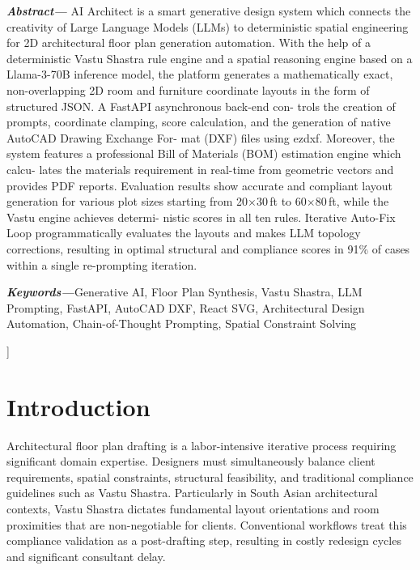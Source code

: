 \documentclass[10pt, twocolumn, letterpaper]{article}
\begin{document}
\begin{center}
\begin{minipage}{0.92\linewidth}
\fontsize{9}{11}\selectfont
\noindent\textbf{\textit{Abstract---}}%
AI Architect is a smart generative design system which connects the creativity of Large Language Models (LLMs) to
deterministic spatial engineering for 2D architectural floor plan generation automation. With the help of a deterministic Vastu Shastra
rule engine and a spatial reasoning engine based on a Llama-3-70B inference model, the platform generates a mathematically exact,
non-overlapping 2D room and furniture coordinate layouts in the form of structured JSON. A FastAPI asynchronous back-end con-
trols the creation of prompts, coordinate clamping, score calculation, and the generation of native AutoCAD Drawing Exchange For-
mat (DXF) files using ezdxf. Moreover, the system features a professional Bill of Materials (BOM) estimation engine which calcu-
lates the materials requirement in real-time from geometric vectors and provides PDF reports. Evaluation results show accurate and
compliant layout generation for various plot sizes starting from 20$\times$30\,ft to 60$\times$80\,ft, while the Vastu engine achieves determi-
nistic scores in all ten rules. Iterative Auto-Fix Loop programmatically evaluates the layouts and makes LLM topology corrections,
resulting in optimal structural and compliance scores in 91\% of cases within a single re-prompting iteration.

\vspace{4pt}
\noindent\textbf{\textit{Keywords---}}Generative AI, Floor Plan Synthesis,
Vastu Shastra, LLM Prompting, FastAPI, AutoCAD DXF, React SVG,
Architectural Design Automation, Chain-of-Thought Prompting,
Spatial Constraint Solving
\end{minipage}

\vspace{12pt}
\end{center}
]%

\section{Introduction}

Architectural floor plan drafting is a labor-intensive iterative process requiring significant domain expertise. Designers must simultaneously balance client requirements, spatial constraints, structural feasibility, and traditional compliance guidelines such as Vastu Shastra. Particularly in South Asian architectural contexts, Vastu Shastra dictates fundamental layout orientations and room proximities that are non-negotiable for clients. Conventional workflows treat this compliance validation as a post-drafting step, resulting in costly redesign cycles and significant consultant delay.
\end{document}

